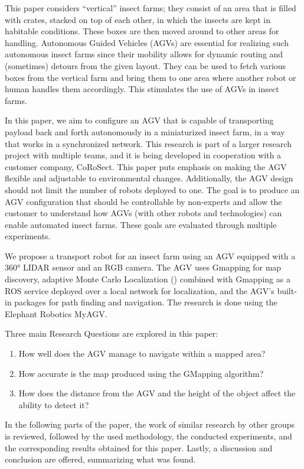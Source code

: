 This paper considers “vertical” insect farms; they consist of an area that is filled with crates, stacked on top of each other, in which the insects are kept in habitable conditions. These boxes are then moved around to other areas for handling. Autonomous Guided Vehicles (AGVs) are essential for realizing such autonomous insect farms since their mobility allows for dynamic routing and (sometimes) detours from the given layout. They can be used to fetch various boxes from the vertical farm and bring them to one area where another robot or human handles them accordingly. This stimulates the use of AGVs in insect farms.

In this paper, we aim to configure an AGV that is capable of transporting payload back and forth autonomously in a miniaturized insect farm, in a way that works in a synchronized network. This research is part of a larger research project with multiple teams, and it is being developed in cooperation with a customer company, CoRoSect. This paper puts emphasis on making the AGV flexible and adjustable to environmental changes. Additionally, the AGV design should not limit the number of robots deployed to one. The goal is to produce an AGV configuration that should be controllable by non-experts and allow the customer to understand how AGVs (with other robots and technologies) can enable automated insect farms. These goals are evaluated through multiple experiments.

We propose a transport robot for an insect farm using an AGV equipped with a 360° LIDAR sensor and an RGB camera. The AGV uses Gmapping for map discovery, adaptive Monte Carlo Localization (\cite{amcl}) combined with Gmapping as a ROS service deployed over a local network for localization, and the AGV's built-in packages for path finding and navigation. The research is done using the Elephant Robotics MyAGV.

Three main Research Questions are explored in this paper:
\begin{enumerate}
    \item How well does the AGV manage to navigate within a mapped area?
    \item How accurate is the map produced using the GMapping algorithm?
    \item How does the distance from the AGV and the height of the object affect the ability to detect it?
\end{enumerate}

In the following parts of the paper, the work of similar research by other groups is reviewed, followed by the used methodology, the conducted experiments, and the corresponding results obtained for this paper. Lastly, a discussion and conclusion are offered, summarizing what was found.

